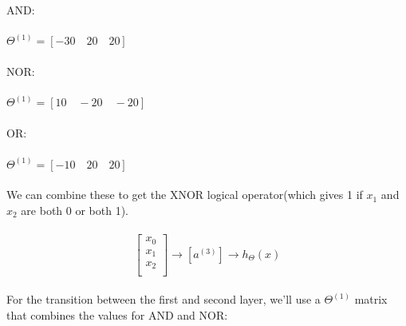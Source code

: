 \documentclass[UTF8]{ctexart}
\begin{document}
\paragraph{}
\begin{algorithm}
\paragraph{}
AND:
\paragraph{}
\quad  $\Theta^{(1)}=[-30 \quad 20 \quad 20]$
\paragraph{}
NOR:
\paragraph{}
\quad   $\Theta^{(1)}=[10 \quad -20 \quad -20]$
\paragraph{}
OR:
\paragraph{}
\quad    $\Theta^{(1)}=[-10 \quad 20 \quad 20]$
\end{algorithm}
\paragraph{}
We can combine these to get the XNOR logical operator(which gives 1 if $x_{1}$ and $x_{2}$ are both 0 or both 1). 
\paragraph{}
\begin{algorithm}
\begin{equation}
\left[\begin{array}{c}
x_{0}\\
x_{1}\\
x_{2}\\
\end{array}\right] \rightarrow  [a^{(3)}]
\rightarrow h_{\Theta}(x) 
\end{equation}
\end{algorithm}
\paragraph{}
For the transition between the first and second layer, we'll use a $\Theta^{(1)}$ matrix that combines the values for AND and NOR:
\end{document}
